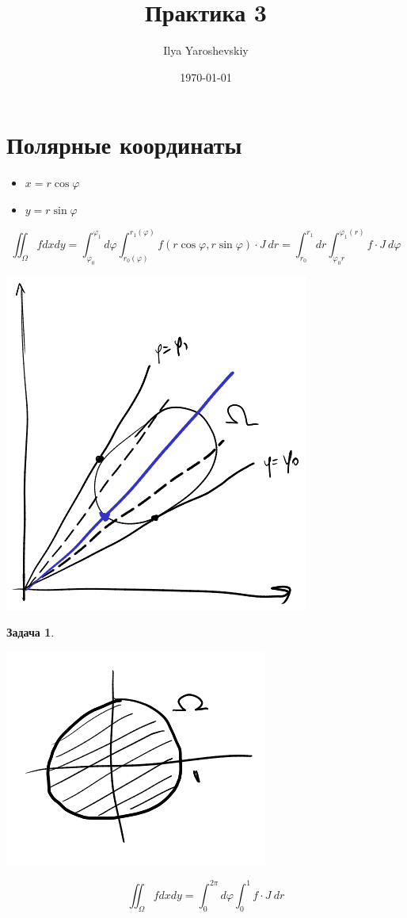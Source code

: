 \documentclass[english]{article}
\author{Ilya Yaroshevskiy}
\date{\today}
\title{Практика 3}
\theoremstyle{plain}
\theoremstyle{remark}
\theoremstyle{definition}
\newtheorem{task}{Задача}
\begin{document}
\maketitle
\tableofcontents


\section{Полярные координаты}
\label{sec:org4de8e41}
\begin{itemize}
\item \(x = r\cos\varphi\)
\item \(y = r\sin\varphi\)
\end{itemize}
\[ \iint_\Omega f dx dy = \int^{\varphi_1}_{\varphi_0} d\varphi \int_{r_0(\varphi)}^{r_1(\varphi)} f(r\cos\varphi, r\sin\varphi)\cdot J\ dr = \int^{r_1}_{r_0} dr \int^{\varphi_1(r)}_{\varphi_0{r}} f\cdot J\ d\varphi \]
\begin{center}
\includegraphics[scale=0.4]{3_1.png}
\end{center}
\begin{task}
\-
\begin{center}
\includegraphics[scale=0.2]{3_2.png}
\end{center}
\[ \iint_\Omega f dx dy = \int^{2\pi}_0 d\varphi\int^1_0 f\cdot J\ dr \]
\end{task}
\end{document}
